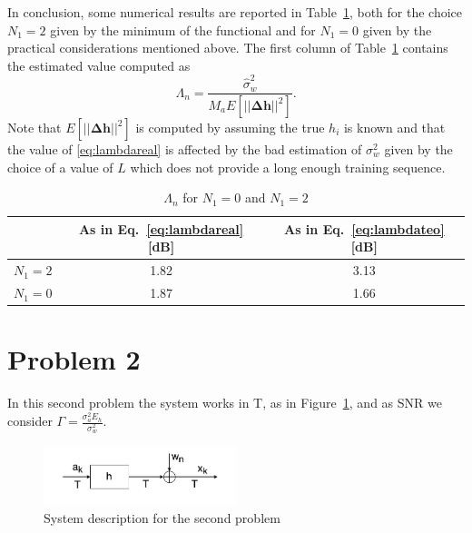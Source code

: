 \documentclass[10pt]{article}
\begin{document}
In conclusion, some numerical results are reported in Table~\ref{table:lambda}, both for the choice $N_1 = 2$ given by the minimum of the functional and for $N_1 = 0$ given by the practical considerations mentioned above. The first column of Table~\ref{table:lambda} contains the estimated value computed as
\begin{equation}
	\Lambda_n = \frac{\hat{\sigma}_w^2}{M_a E[||\mathbf{\Delta h}||^2]}.
	\label{eq:lambdareal}
\end{equation}
Note that $E[||\mathbf{\Delta h}||^2]$ is computed by assuming the true $h_i$ is known and that the value of \eqref{eq:lambdareal} is affected by the bad estimation of $\sigma_w^2$ given by the choice of a value of $L$ which does not provide a long enough training sequence.

\begin{table}[h!]
	\centering
	\begin{tabular}{c|c|c}
				&	As in Eq.~\eqref{eq:lambdareal} [dB]	& As in Eq.~\eqref{eq:lambdateo} [dB]  \\ \hline
	$N_1 = 2$	&	1.82							& 3.13 \\
	$N_1 = 0$	&	1.87							& 1.66 \\
	\end{tabular}
	\caption{$\Lambda_n$ for $N_1 = 0$ and $N_1 = 2$}
	\label{table:lambda}
\end{table}


\section*{Problem 2}

In this second problem the system works in T, as in Figure~\ref{fig:channelt}, and as SNR we consider $\Gamma = \frac{\sigma_a^2 E_h}{\sigma_w^2}$. 

\begin{figure}[hb]
	\centering
	\includegraphics[width=0.5\textwidth]{channel_t}
	\caption{System description for the second problem}
	\label{fig:channelt}
\end{figure}
\end{document}
